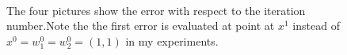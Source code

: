\documentclass[12pt,a4paper]{article}
\begin{document}
	\begin{figure}
		\centering
		\\
		
		
		\caption{ The four pictures show the error with respect to the iteration number.Note the the first error is evaluated at point at $x^1$ instead of $x^0=w^0_1=w^0_2=(1,1)$ in my experiments. } %
		\label{img2}
	\end{figure}
	
\end{document}
